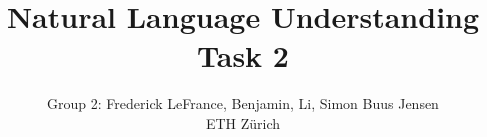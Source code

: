 \title{\Huge Natural Language Understanding\\Task 2} 

\author{
Group 2: Frederick LeFrance, Benjamin, Li, Simon Buus Jensen\\
\normalsize{ETH Z{\"u}rich}
}

\maketitle

